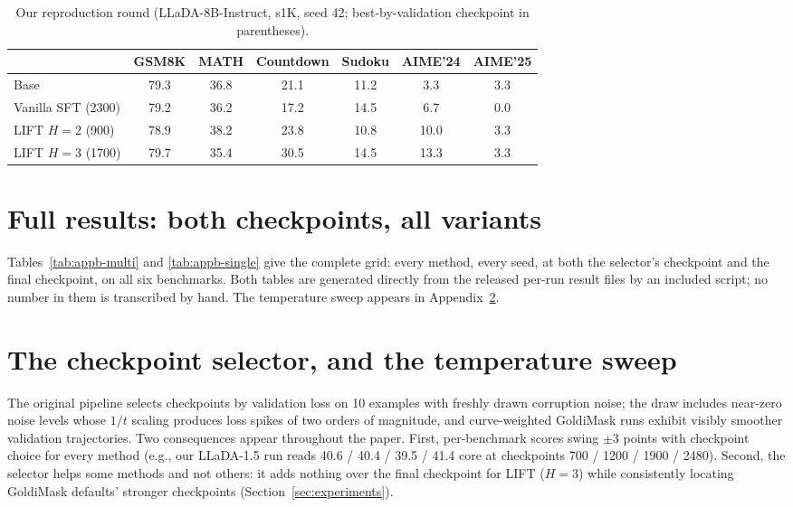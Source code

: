 \documentclass{article} %
\begin{document}
\begin{table}[h]
\caption{Our reproduction round (LLaDA-8B-Instruct, s1K, seed 42; best-by-validation checkpoint in parentheses).}
\label{tab:repro}
\begin{center}
\begin{tabular}{lcccccc}
\toprule
 & GSM8K & MATH & Countdown & Sudoku & AIME'24 & AIME'25 \\
\midrule
Base                    & 79.3 & 36.8 & 21.1 & 11.2 & 3.3 & 3.3 \\
Vanilla SFT (2300)      & 79.2 & 36.2 & 17.2 & 14.5 & 6.7 & 0.0 \\
LIFT $H{=}2$ (900)      & 78.9 & 38.2 & 23.8 & 10.8 & 10.0 & 3.3 \\
LIFT $H{=}3$ (1700)     & 79.7 & 35.4 & 30.5 & 14.5 & 13.3 & 3.3 \\
\bottomrule
\end{tabular}
\end{center}
\end{table}

\section{Full results: both checkpoints, all variants}
\label{app:full}
Tables~\ref{tab:appb-multi} and \ref{tab:appb-single} give the complete grid: every method, every seed, at both the selector's checkpoint and the final checkpoint, on all six benchmarks. Both tables are generated directly from the released per-run result files by an included script; no number in them is transcribed by hand. The temperature sweep appears in Appendix~\ref{app:selector}.



\section{The checkpoint selector, and the temperature sweep}
\label{app:selector}
The original pipeline selects checkpoints by validation loss on 10 examples with freshly drawn corruption noise; the draw includes near-zero noise levels whose $1/t$ scaling produces loss spikes of two orders of magnitude, and curve-weighted GoldiMask runs exhibit visibly smoother validation trajectories. Two consequences appear throughout the paper. First, per-benchmark scores swing $\pm 3$ points with checkpoint choice for every method (e.g., our LLaDA-1.5 run reads 40.6 / 40.4 / 39.5 / 41.4 core at checkpoints 700 / 1200 / 1900 / 2480). Second, the selector helps some methods and not others: it adds nothing over the final checkpoint for LIFT ($H{=}3$) while consistently locating GoldiMask defaults' stronger checkpoints (Section~\ref{sec:experiments}).
\end{document}
